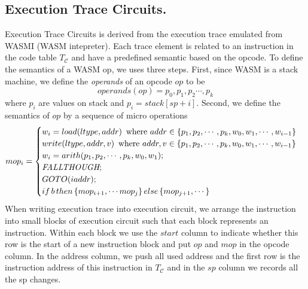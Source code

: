 \subsection{Execution Trace Circuits.}
\label{chp:ex-table}
Execution Trace Circuits is derived from the execution trace emulated from WASMI (WASM intepreter). Each trace element is related to an instruction in the code table $T_\mathcal{C}$ and have a predefined semantic based on the opcode. To define the semantics of a WASM op, we uses three steps. First, since WASM is a stack machine, we define the \emph{operands} of an opcode $op$ to be
\[
operands(op) = p_0, p_1, p_2 \cdots, p_k
\]
where $p_i$ are values on stack and $p_i = stack[sp+i]$.
Second, we define the semantics of $op$ by a sequence of micro operations
\[
mop_i = \begin{cases}
    w_i = load(ltype, addr)\, \textnormal{ where $addr \in \{p_1, p_2, \cdots, p_k, w_0, w_1, \cdots, w_{i-1}\}$}\\
    write(ltype, addr, v)\, \textnormal{ where $addr, v \in \{p_1, p_2, \cdots, p_k, w_0, w_1, \cdots, w_{i-1}\}$}\\
    w_i = arith(p_1, p_2,\cdots, p_k, w_0, w_1); \\
    \textit{FALLTHOUGH}; \\
    GOTO(iaddr); \\
    if \, b\, then\, \{mop_{i+1}, \cdots mop_{j}\} \,else\, \{mop_{j+1},\cdots\}
    \end{cases}
\]
When writing execution trace into execution circuit, we arrange the instruction into small blocks of execution circuit such that each block represents an instruction. Within each block we use the $start$ column to indicate whether this row is the start of a new instruction block and put $op$ and $mop$ in the opcode column. In the address column, we push all used address and the first row is the instruction address of this instruction in $T_\mathcal{C}$ and in the $sp$ column we records all the sp changes.
